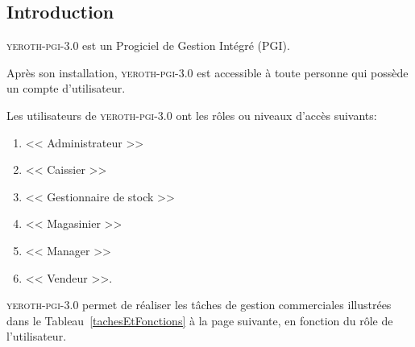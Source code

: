 \documentclass[a4paper, 10pt]{article}
\newcommand{\yeroth}{\textsc{yeroth-pgi-3.0}\xspace}
\newcommand{\manager}{<< Manager >>\xspace}
\newcommand{\caissier}{<< Caissier >>\xspace}
\newcommand{\administrateur}{<< Administrateur >>\xspace}
\newcommand{\magasinier}{<< Magasinier >>\xspace}
\newcommand{\vendeur}{<< Vendeur >>\xspace}
\newcommand{\gestionairedestocks}{<< Gestionnaire de stock >>\xspace}
\begin{document}
\begin{multicols}{2}





\vspace{-1.3em}
\section{Introduction}
\vspace{-0.3em}
\yeroth est un Progiciel de Gestion Intégré (PGI).

Apr\`es son installation, \yeroth est accessible \`a
toute personne qui poss\`ede un compte d'utilisateur.

Les utilisateurs de \yeroth ont les r\^oles ou 
niveaux d'acc\`es suivants:
\begin{enumerate}[1.]
	\itemsep -0.3em
	\item \administrateur
	\item \caissier	
	\item \gestionairedestocks
	\item \magasinier	
	\item \manager
	\item \vendeur.
\end{enumerate}

\yeroth permet de r\'ealiser les t\^aches de gestion
commerciales illustr\'ees dans
le Tableau~\ref{tachesEtFonctions} \`a la page suivante,
en fonction du r\^ole de l'utilisateur.

\vspace{-1.0em}

\end{multicols}
\end{document}
